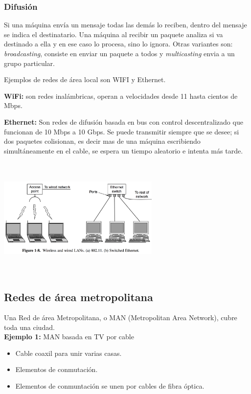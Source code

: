 \documentclass[10pt,a4paper]{report}
\begin{document}
\subsubsection{Difusión}
\par Si una máquina envía un mensaje todas las demás lo reciben, dentro del mensaje 
se indica el destinatario. Una máquina al recibir un paquete analiza si va destinado a 
ella y en ese caso lo procesa, sino lo ignora. Otras variantes son: \textit{broadcasting}, 
consiste en enviar un paquete a todos y \textit{multicasting} envia a un grupo 
particular.
\par Ejemplos de redes de área local son WIFI y Ethernet.

\textbf{WiFi:} son redes inalámbricas, operan a velocidades desde 11 hasta cientos de 
Mbps.

\textbf{Ethernet:} Son redes de difusión basada en bus con control descentralizado 
que funcionan de 10 Mbps a 10 Gbps. Se puede transmitir siempre que se desee; si 
dos paquetes colisionan, es decir mas de una máquina escribiendo simultáneamente en 
el cable, se espera un tiempo aleatorio e intenta más tarde.

\begin{center} 
	\includegraphics[width=8cm, height=6cm]{./imagenes/arealocal.png} 
\end{center}

\subsection{Redes de área metropolitana}
\par Una Red de área Metropolitana, o MAN (Metropolitan Area Network), cubre toda 
una ciudad. \\

\textbf{Ejemplo 1:} MAN basada en TV por cable
	\begin{itemize}
		\item Cable coaxil para unir varias casas.
		\item Elementos de conmutación.
		\item Elementos de conmuntación se unen por cables de fibra óptica.
	\end{itemize}
	
\end{document}
